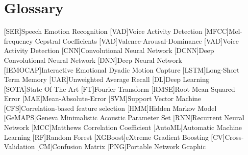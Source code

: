 \chapter{Glossary}

\footnotesize
\SingleSpacing

\begin{multicols}{2}
\begin{acronym}[AAAAAA]
    [SER]{Speech Emotion Recognition}
    [VAD]{Voice Activity Detection}
    [MFCC]{Mel-frequency Cepstral Coefficients}
    [VAD]{Valence-Arousal-Dominance}
    [VAD]{Voice Activity Detection}
    [CNN]{Convolutional Neural Network}
    [DCNN]{Deep Convolutional Neural Network}
    [DNN]{Deep Neural Network}
    [IEMOCAP]{Interactive Emotional Dyadic Motion Capture}
    [LSTM]{Long-Short Term Memory}
    [UAR]{Unweighted Average Recall}
    [DL]{Deep Learning}
    [SOTA]{State-Of-The-Art}
    [FT]{Fourier Transform}
    [RMSE]{Root-Mean-Squared-Error}
    [MAE]{Mean-Absolute-Error}
    [SVM]{Support Vector Machine}
    [CFS]{Correlation-based feature selection}
    [HMM]{Hidden Markov Model}
    [GeMAPS]{Geneva Minimalistic Acoustic Parameter Set}
    [RNN]{Recurrent Neural Network}
    [MCC]{Matthews Correlation Coefficient}
    [AutoML]{Automatic Machine Learning}
    [RF]{Random Forest}
    [XGBoost]{eXtreme Gradient Boosting}
    [CV]{Cross-Validation}
    [CM]{Confusion Matrix}
    [PNG]{Portable Network Graphic}
\end{acronym}
\end{multicols}

